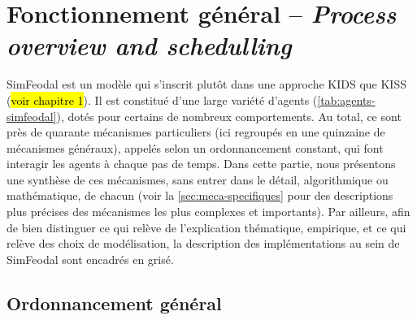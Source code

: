 \let\orisectionmark\sectionmark
\renewcommand\sectionmark[1]{}%
\section[Fonctionnement général -- \textit{Process overview and schedulling}]{Fonctionnement général -- \large{\textit{Process overview and schedulling}}\label{sec:fonctionnement-general}}
\orisectionmark{Fonctionnement général}
\let\sectionmark\orisectionmark

SimFeodal est un modèle qui s'inscrit plutôt dans une approche KIDS que KISS (\hl{voir chapitre 1}).
Il est constitué d'une large variété d'agents (\cref{tab:agents-simfeodal}), dotés pour certains de nombreux comportements.
Au total, ce sont près de quarante mécanismes particuliers (ici regroupés en une quinzaine de mécanismes généraux), appelés selon un ordonnancement constant, qui font interagir les agents à chaque pas de temps.
Dans cette partie, nous présentons une synthèse de ces mécanismes, sans entrer dans le détail, algorithmique ou mathématique, de chacun (voir la \cref{sec:meca-specifiques} pour des descriptions plus précises des mécanismes les plus complexes et importants).
Par ailleurs, afin de bien distinguer ce qui relève de l'explication thématique, empirique, et ce qui relève des choix de modélisation, la description des implémentations au sein de SimFeodal sont encadrés en grisé.

\subsection*{Ordonnancement général \label{meca-ordonancement}}



